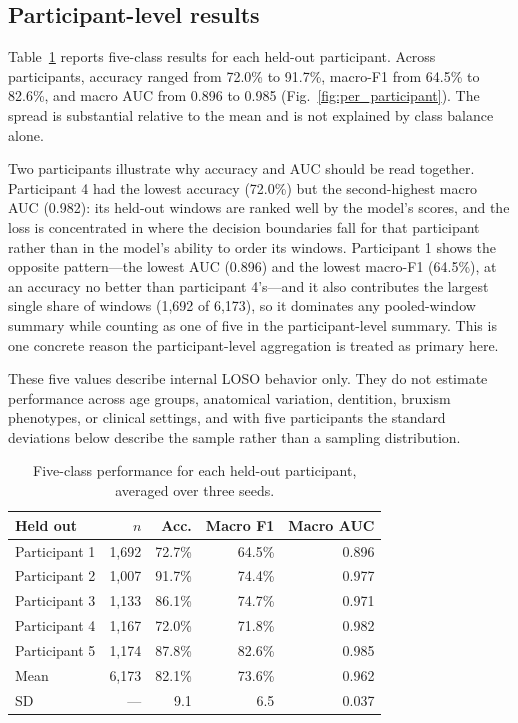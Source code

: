 \documentclass[pdflatex,sn-nature,iicol]{sn-jnl}
\begin{document}
\subsection{Participant-level results}

Table~\ref{tab:persubject} reports five-class results for each held-out participant. Across participants, accuracy ranged from 72.0\% to 91.7\%, macro-F1 from 64.5\% to 82.6\%, and macro AUC from 0.896 to 0.985 (Fig.~\ref{fig:per_participant}). The spread is substantial relative to the mean and is not explained by class balance alone.

Two participants illustrate why accuracy and AUC should be read together. Participant 4 had the lowest accuracy (72.0\%) but the second-highest macro AUC (0.982): its held-out windows are ranked well by the model's scores, and the loss is concentrated in where the decision boundaries fall for that participant rather than in the model's ability to order its windows. Participant 1 shows the opposite pattern---the lowest AUC (0.896) and the lowest macro-F1 (64.5\%), at an accuracy no better than participant 4's---and it also contributes the largest single share of windows (1,692 of 6,173), so it dominates any pooled-window summary while counting as one of five in the participant-level summary. This is one concrete reason the participant-level aggregation is treated as primary here.

These five values describe internal LOSO behavior only. They do not estimate performance across age groups, anatomical variation, dentition, bruxism phenotypes, or clinical settings, and with five participants the standard deviations below describe the sample rather than a sampling distribution.

\begin{table}[h]
  \caption{Five-class performance for each held-out participant, averaged over three seeds.}
  \label{tab:persubject}
  \centering
  \footnotesize
  \begin{tabular*}{\columnwidth}{@{\extracolsep{\fill}}lrrrr@{}}
    \toprule
    Held out & $n$ & Acc. & Macro F1 & Macro AUC \\
    \midrule
    Participant 1 & 1,692 & 72.7\% & 64.5\% & 0.896 \\
    Participant 2 & 1,007 & 91.7\% & 74.4\% & 0.977 \\
    Participant 3 & 1,133 & 86.1\% & 74.7\% & 0.971 \\
    Participant 4 & 1,167 & 72.0\% & 71.8\% & 0.982 \\
    Participant 5 & 1,174 & 87.8\% & 82.6\% & 0.985 \\
    \midrule
    Mean & 6,173 & 82.1\% & 73.6\% & 0.962 \\
    SD & --- & 9.1 & 6.5 & 0.037 \\
    \bottomrule
  \end{tabular*}
\end{table}
\end{document}

